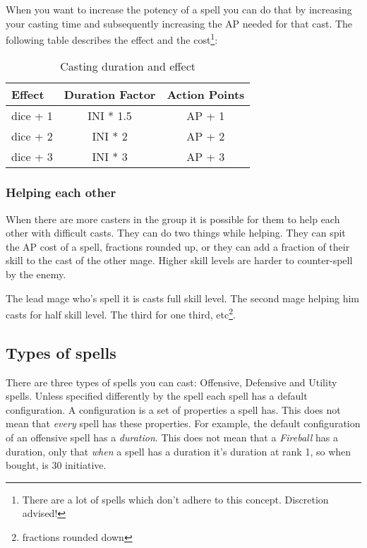 \bigskip

When you want to increase the potency of a spell you can do that by increasing your casting time and subsequently increasing the AP needed for that cast. The following table describes the effect and the cost\footnote{There are a lot of spells which don't adhere to this concept. Discretion advised!}:


\begin{table}[H]
\caption{Casting duration and effect}
\begin{center}
\begin{tabular}{l | c | c}
Effect & Duration Factor & Action Points \\
 \hline
dice + 1 & INI * 1.5 & AP + 1 \\
dice + 2 & INI * 2 & AP + 2 \\
dice + 3 & INI * 3 & AP + 3
\end{tabular}
\end{center}
\end{table}

\subsubsection{Helping each other}
When there are more casters in the group it is possible for them to help each other with difficult casts. They can do two things while helping. They can spit the AP cost of a spell, fractions rounded up, or they can add a fraction of their skill to the cast of the other mage. Higher skill levels are harder to counter-spell by the enemy.

The lead mage who's spell it is casts full skill level. The second mage helping him casts for half skill level. The third for one third, etc\footnote{fractions rounded down}. 

\subsection{Types of spells}
There are three types of spells you can cast: Offensive, Defensive and Utility spells. Unless specified differently by the spell each spell has a default configuration. A configuration is a set of properties a spell has. This does not mean that \emph{every} spell has these properties. For example, the default configuration of an offensive spell has a \emph{duration}. This does not mean that a \emph{Fireball} has a duration, only that \emph{when} a spell has a duration it's duration at rank 1, so when bought, is 30 initiative.

